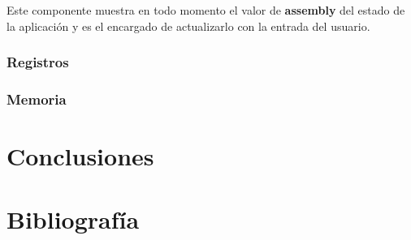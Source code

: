 {{            Este componente muestra en todo momento el valor de \textbf{assembly} del estado de la aplicación y es el encargado de actualizarlo con la entrada del usuario.
        }
        
        \subsubsection{Registros}
        {
        }

        \subsubsection{Memoria}
        {
        }
    }

\section{Conclusiones}
\section{Bibliografía}



